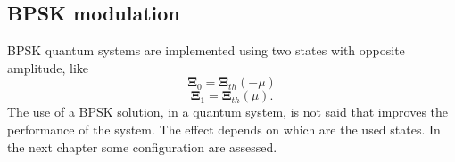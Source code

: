     \subsection{BPSK modulation}
        BPSK quantum systems are implemented using two states with opposite amplitude, like
        \begin{equation}
            \pmb{\Xi}_0 = \pmb{\Xi}_{th}(-\mu)
            \label{eq:2.1.2}
        \end{equation}
        \begin{equation*}
            \pmb{\Xi}_1 = \pmb{\Xi}_{th}(\mu).
        \end{equation*}
        The use of a BPSK solution, in  a quantum system, is not said that improves the performance
        of the system. The effect depends on which are the used states. In the next chapter some 
        configuration are assessed.
